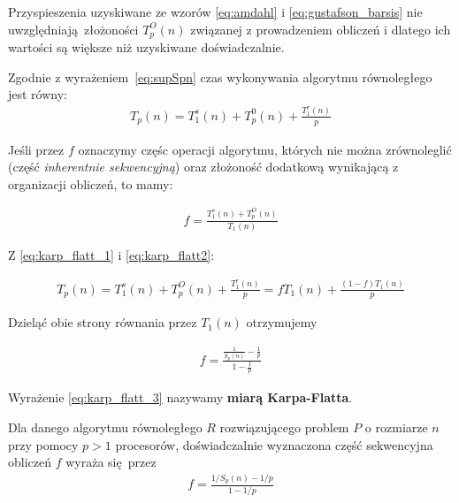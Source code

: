Przyspieszenia uzyskiwane ze wzorów \eqref{eq:amdahl} i \eqref{eq:gustafson_barsis} nie uwzględniają złożoności \(T_{p}^{O}(n)\) związanej z prowadzeniem obliczeń i dlatego ich wartości są większe niż uzyskiwane doświadczalnie.

Zgodnie z wyrażeniem \ref{eq:supSpn} czas wykonywania algorytmu równoległego jest równy:
\begin{align}\label{eq:karp_flatt_1}
T_{p}(n)=T_{1}^{s}(n)+T_{p}^{0}(n) + \frac{T_{1}^{r}(n)}{p}
\end{align}

Jeśli przez \(f\) oznaczymy częśc operacji algorytmu, których nie można zrównoleglić (część \emph{inherentnie sekwencyjną}) oraz złożoność dodatkową wynikającą z organizacji obliczeń, to mamy:

\begin{align}
f=\frac{T_{1}^{s}(n)+T_{p}^{O}(n)}{T_{1}(n)}\label{eq:karp_flatt2}
\end{align}

Z \eqref{eq:karp_flatt_1} i \eqref{eq:karp_flatt2}:

\begin{align}
T_{p}(n)=T_{1}^{s}(n)+T_{p}^{O}(n)+\frac{T_{1}^{r}(n)}{p} = fT_{1}(n)+\frac{(1-f)T_{1}(n)}{p}
\end{align}

Dzieląć obie strony równania przez \(T_{1}(n)\) otrzymujemy

\begin{align}\label{eq:karp_flatt_3}
f=\frac{\frac{1}{S_{p}(n)}-\frac{1}{p}}{1-\frac{1}{p}}
\end{align}

Wyrażenie \eqref{eq:karp_flatt_3} nazywamy \textbf{miarą Karpa-Flatta}.

\begin{definicja}
Dla danego algorytmu równoległego \(R\) rozwiązującego problem \(P\) o rozmiarze \(n\) przy pomocy \(p>1\) procesorów, doświadczalnie wyznaczona część sekwencyjna obliczeń \(f\) wyraża się przez
\begin{align}
f = \frac{1/S_{p}(n) - 1/p}{1 - 1/p}
\end{align}
\end{definicja}

